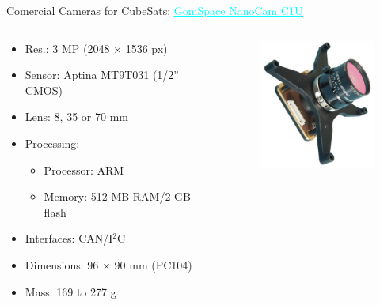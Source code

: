 \begin{frame}{Comercial Cameras for CubeSats: \href{https://gomspace.com/shop/payloads/earth-observation.aspx}{\textcolor{cyan}{\underline{GomSpace NanoCam C1U}}}}

    \begin{columns}[t]
        \begin{column}[t]{0.6\textwidth}
            \begin{itemize}
                \item Res.: 3 MP (2048 $\times$ 1536 px)
                \item Sensor: Aptina MT9T031 (1/2'' CMOS)
                \item Lens: 8, 35 or 70 mm
                \item Processing:
                    \begin{itemize}
                        \item Processor: ARM
                        \item Memory: 512 MB RAM/2 GB flash
                    \end{itemize}
                \item Interfaces: CAN/I$^{2}$C
                \item Dimensions: 96 $\times$ 90 mm (PC104)
                \item Mass: 169 to 277 g
            \end{itemize}
        \end{column}
        \begin{column}[t]{0.4\textwidth}
            \vspace{0.7cm}
            \begin{figure}[!ht]
                \begin{center}
                    \includegraphics[width=4cm]{figures/nanocamc1u}
                \end{center}
            \end{figure}
        \end{column}
    \end{columns}

\end{frame}

